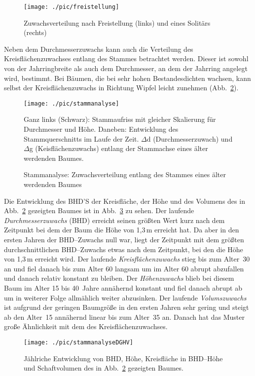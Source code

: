 \documentclass[twocolumn]{scrartcl}
\begin{document}
\begin{figure}[htbp]
  \centering
  \texttt{[image: ./pic/freistellung]}
  \caption{Zuwachsverteilung nach Freistellung (links) und eines Solitärs (rechts)}
  \label{fig:freistellung}
\end{figure}

Neben dem Durchmesserzuwachs kann auch die Verteilung des Kreisflächenzuwachses
entlang des Stammes betrachtet werden. Dieser ist sowohl von der Jahrringbreite
als auch dem Durchmesser, an dem der Jahrring angelegt wird, bestimmt. Bei
Bäumen, die bei sehr hohen Bestandesdichten wachsen, kann selbst der
Kreisflächenzuwachs in Richtung Wipfel leicht zunehmen
(Abb.~\ref{fig:stammanalyse}).

\begin{figure}[htbp]
  \centering
  \texttt{[image: ./pic/stammanalyse]}
  \caption{Stammanalyse: Zuwachsverteilung entlang des Stammes eines älter
  werdenden Baumes}
  \footnotesize{Ganz links (Schwarz): Stammaufriss mit gleicher Skalierung für Durchmesser und Höhe. Daneben: Entwicklung des Stammquerschnitts im Laufe der Zeit. $\Delta$d (Durchmesserzuwach) und $\Delta$g (Keisflächenzuwachs) entlang der Stammachse eines älter werdenden Baumes.}
  \label{fig:stammanalyse}
\end{figure}

Die Entwicklung des BHD'S der Kreisfläche, der Höhe und des Volumens des in
Abb.~\ref{fig:stammanalyse} gezeigten Baumes ist in
Abb.~\ref{fig:stammanalyseDGHV} zu sehen. Der laufende \emph{Durchmesserzuwachs}
(BHD) erreicht seinen größten Wert kurz nach dem Zeitpunkt bei dem der Baum die
Höhe von 1,3\,m erreicht hat. Da aber in den ersten Jahren der BHD--Zuwachs null
war, liegt der Zeitpunkt mit dem größten durchschnittlichen BHD--Zuwachs etwas
nach dem Zeitpunkt, bei den die Höhe von 1,3\,m erreicht wird. Der laufende
\emph{Kreisflächenzuwachs} stieg bis zum Alter~30 an und fiel danach bis zum
Alter 60 langsam um im Alter 60 abrupt abzufallen und danach relativ konstant zu
bleiben. Der \emph{Höhenzuwachs} blieb bei diesem Baum im Alter 15 bis 40~Jahre
annähernd konstant und fiel danach abrupt ab um in weiterer Folge allmählich
weiter abzusinken. Der laufende \emph{Volumszuwachs} ist aufgrund der geringen
Baumgröße in den ersten Jahren sehr gering und steigt ab den Alter~15 annähernd
linear bis zum Alter~35 an. Danach hat das Muster große Ähnlichkeit mit dem des
Kreisflächenzuwachses.

\begin{figure}[htbp]
  \centering
  \texttt{[image: ./pic/stammanalyseDGHV]}
  \caption{Jählriche Entwicklung von BHD, Höhe, Kreisfläche in BHD--Höhe und
  Schaftvolumen des in Abb.~\ref{fig:stammanalyse} gezeigten Baumes.}
  \label{fig:stammanalyseDGHV}
\end{figure}
\end{document}
